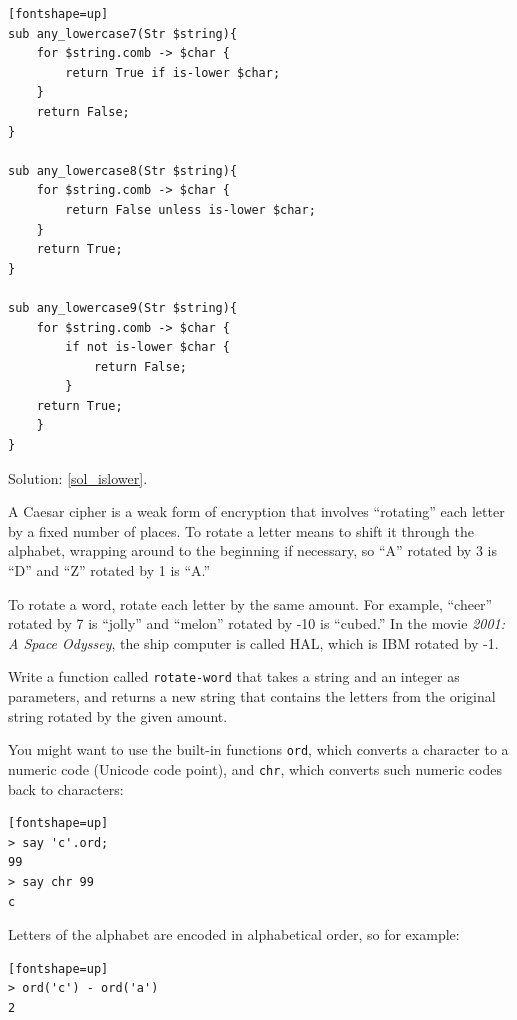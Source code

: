 \begin{exercise}
\begin{verbatim}[fontshape=up]
sub any_lowercase7(Str $string){
    for $string.comb -> $char {
        return True if is-lower $char;
    }
    return False;
}

sub any_lowercase8(Str $string){
    for $string.comb -> $char {
        return False unless is-lower $char;
    }
    return True;
}

sub any_lowercase9(Str $string){
    for $string.comb -> $char {
        if not is-lower $char {
            return False;
        }
    return True;
    }
}
\end{verbatim}

Solution: \ref{sol_islower}.

\end{exercise}


\begin{exercise}

\label{rotate}
A Caesar cipher is a weak form of encryption that involves 
``rotating'' each letter by a fixed number of places.  To 
rotate a letter means to shift it through the alphabet, 
wrapping around to the beginning if necessary, so ``A'' 
rotated by 3 is ``D'' and ``Z'' rotated by 1 is ``A.''

To rotate a word, rotate each letter by the same amount.
For example, ``cheer'' rotated by 7 is ``jolly'' and ``melon'' rotated
by -10 is ``cubed.''  In the movie {\em 2001: A Space Odyssey}, the 
ship computer is called HAL, which is IBM rotated by -1.

Write a function called \verb"rotate-word"
that takes a string and an integer as parameters, and returns
a new string that contains the letters from the original string
rotated by the given amount.  

You might want to use the built-in functions {\tt ord}, which 
converts a character to a numeric code (Unicode code point), and 
{\tt chr}, which converts such numeric codes back to characters:

\begin{verbatim}[fontshape=up]
> say 'c'.ord;
99
> say chr 99
c
\end{verbatim}
%

Letters of the alphabet are encoded in alphabetical
order, so for example:

\begin{verbatim}[fontshape=up]
> ord('c') - ord('a')
2
\end{verbatim}


\end{exercise}
